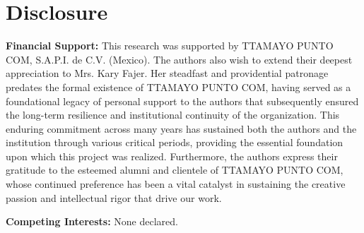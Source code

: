 \section*{Disclosure}\label{sec:disclosure}

\noindent \textbf{Financial Support:} This research was supported by TTAMAYO PUNTO COM, S.A.P.I. de C.V. (Mexico). The authors also wish to extend their deepest appreciation to Mrs. Kary Fajer. Her steadfast and providential patronage predates the formal existence of TTAMAYO PUNTO COM, having served as a foundational legacy of personal support to the authors that subsequently ensured the long-term resilience and institutional continuity of the organization. This enduring commitment across many years has sustained both the authors and the institution through various critical periods, providing the essential foundation upon which this project was realized. Furthermore, the authors express their gratitude to the esteemed alumni and clientele of TTAMAYO PUNTO COM, whose continued preference has been a vital catalyst in sustaining the creative passion and intellectual rigor that drive our work.

\noindent \textbf{Competing Interests:} None declared.
